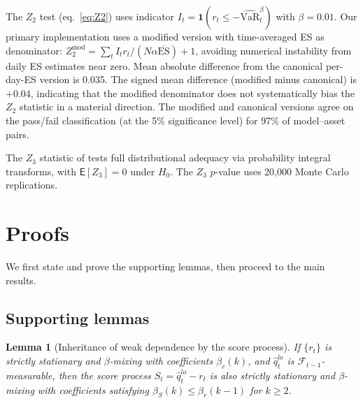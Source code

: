 \documentclass[preprint,11pt,authoryear]{elsarticle}
\newtheorem{lemma}[theorem]{Lemma}
\newcommand{\VaR}{\mathrm{VaR}}
\newcommand{\ES}{\mathrm{ES}}
\newcommand{\E}{\mathsf{E}}
\newcommand{\1}{\boldsymbol{1}}
\begin{document}
	The $Z_2$ test (eq.~\ref{eq:Z2}) uses indicator
	$I_t = \1(r_t \leq -\widehat{\VaR}_t^\beta)$ with $\beta = 0.01$.
	Our primary implementation uses a modified version with
	time-averaged ES as denominator:
	$Z_2^{\text{mod}} = \sum_t I_t r_t / (N\alpha\overline{\ES}) + 1$,
	avoiding numerical instability from daily ES estimates near zero.
	Mean absolute difference from the canonical per-day-ES version
	is 0.035. The signed mean difference (modified minus canonical) is $+0.04$, indicating that the modified denominator does not systematically bias the $Z_2$ statistic in a material direction. The modified and canonical versions agree on the pass/fail classification (at the 5\% significance level) for 97\% of model--asset pairs.
	
	The $Z_3$ statistic of \citet{acerbi2014back} tests full
	distributional adequacy via probability integral transforms, with
	$\E[Z_3] = 0$ under $H_0$. The $Z_3$ $p$-value uses 20,000 Monte
	Carlo replications.
	
	\section{Proofs}
	\label{app:proofs}
	
	We first state and prove the supporting lemmas, then proceed to the main results.
	
	\subsection{Supporting lemmas}
	
	\begin{lemma}[Inheritance of weak dependence by the score process]
		\label{lem:score_mixing}
		If $\{r_t\}$ is strictly stationary and $\beta$-mixing with coefficients $\beta_r(k)$, and $\hat q_t^{lo}$ is $\mathcal F_{t-1}$-measurable, then the score process $S_t=\hat q_t^{lo}-r_t$ is also strictly stationary and $\beta$-mixing with coefficients satisfying $\beta_S(k) \le \beta_r(k-1)$ for $k \ge 2$.
	\end{lemma}
	
\end{document}
